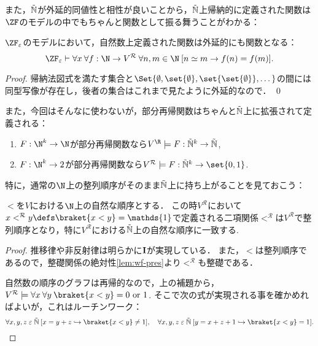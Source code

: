 \documentclass[realisability.tex]{subfiles}
\begin{document}
また，$\NN$が外延的同値性と相性が良いことから，$\NN$上帰納的に定義された関数は$\ZF$のモデルの中でもちゃんと関数として振る舞うことがわかる：

\begin{lemma}\label{lem:nat-func-strong}
 $\ZF_{\varepsilon}$のモデルにおいて，自然数上定義された関数は外延的にも関数となる：
 \[
 \ZFe \vdash \forall x \: \forall f : \N \to V^{\mathcal{R}}\:
 \forall n, m \in \N \: [n \simeq m \to f(n) = f(m)].
 \]
\end{lemma}
\begin{proof}
 帰納法図式を満たす集合と$\Set{ \emptyset, \set{\emptyset}, \set{\set{\emptyset}}, \dots}$の間には同型写像が存在し，後者の集合はこれまで見たように外延的なので． \qed
\end{proof}

また，今回はそんなに使わないが，部分再帰関数はちゃんと$\NN$上に拡張されて定義される：
\begin{lemma}\label{lem:recursives-defined}
 \begin{enumerate}
  \item $F: \N^k \to \N$が部分再帰関数なら$V^{\R} \models F: \NN^k \to \NN$,
  \item $F: \N^k \to 2$が部分再帰関数なら$V^{\mathcal{R}} \models F: \NN^k \to \set{0, 1}$.
 \end{enumerate}
\end{lemma}

特に，通常の$\N$上の整列順序がそのまま$\NN$上に持ち上がることを見ておこう：

\begin{lemma}[$\NN$における自然な順序]\label{lem:nat-ord-in-NN}
 ${<}$を$V$における$\N$上の自然な順序とする．
 この時$V^{\mathcal{R}}$において$x <^{\mathcal{R}} y \defs \braket{x < y} = \mathds{1}$で定義される二項関係$<^{\mathcal{R}}$は$V^{\mathcal{R}}$で整列順序となり，特に$V^{\mathcal{R}}$における$\NN$上の自然な順序に一致する.
\end{lemma}
\begin{proof}
 推移律や非反射律は明らかに$\mathsf{\mathbf{I}}$が実現している．
 また，$<$は整列順序であるので，整礎関係の絶対性\ref{lem:wf-pres}より$<^\mathcal{R}$も整礎である．

 自然数の順序のグラフは再帰的なので，上の補題から，$V^{\mathcal{R}} \models \forall x\: \forall y\: \braket{x < y} = 0 \text{ or } 1$.
 そこで次の式が実現される事を確かめればよいが，これはルーチンワーク：
 \[
  \forall x, y, z \strin \NN\: [x = y + z \hookrightarrow \braket{x < y} \neq 1],\quad
  \forall x, y, z \strin \NN\: [y = x + z + 1 \hookrightarrow \braket{x < y} = 1].
 \]
\end{proof}
\end{document}
